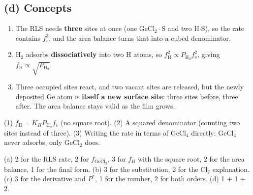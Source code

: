 \documentclass[11pt]{article}
\begin{document}
\subsection*{(d) Concepts}
\begin{answer}
\begin{enumerate}[label=(\roman*),itemsep=1pt]
\item The RLS needs \textbf{three} sites at once (one GeCl$_2\cdot$S and two H$\cdot$S), so the rate contains $f_v^3$, and the
area balance turns that into a cubed denominator.
\item H$_2$ adsorbs \textbf{dissociatively} into two H atoms, so $f_{\mathrm{H}}^2\propto P_{\mathrm{H_2}}f_v^2$, giving $f_{\mathrm{H}}\propto\sqrt{P_{\mathrm{H_2}}}$.
\item Three occupied sites react, and two vacant sites are released, but the newly deposited Ge atom is \textbf{itself a new
surface site}: three sites before, three after. The area balance stays valid as the film grows.
\end{enumerate}
\end{answer}
\begin{mistake}
(1) $f_{\mathrm{H}}=K_HP_{\mathrm{H_2}}f_v$ (no square root). (2) A squared denominator (counting two sites instead of three).
(3) Writing the rate in terms of GeCl$_4$ directly: GeCl$_4$ never adsorbs, only GeCl$_2$ does.
\end{mistake}

\begin{grading}
(a) 2 for the RLS rate, 2 for $f_{\mathrm{GeCl_2}}$, 3 for $f_{\mathrm{H}}$ with the square root, 2 for the area balance, 1 for the final form.
(b) 3 for the substitution, 2 for the Cl$_2$ explanation.
(c) 3 for the derivative and $P^*$, 1 for the number, 2 for both orders.
(d) 1 + 1 + 2.
\end{grading}
\end{document}
